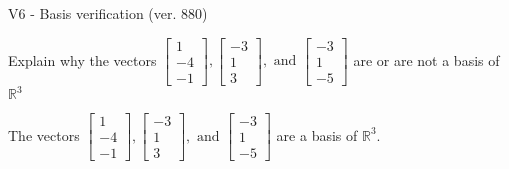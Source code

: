 \begin{exercise}
  \begin{exerciseTitle}V6 - Basis verification (ver. 880)\end{exerciseTitle}
  \begin{exerciseStatement}
    Explain why the vectors \(\left[\begin{array}{r}
1 \\
-4 \\
-1
\end{array}\right] , \left[\begin{array}{r}
-3 \\
1 \\
3
\end{array}\right] , \text{ and } \left[\begin{array}{r}
-3 \\
1 \\
-5
\end{array}\right]\) are or are not a basis of \(\mathbb{R}^3\)	


  \end{exerciseStatement}
  \begin{exerciseAnswer}
   The vectors \(\left[\begin{array}{r}
1 \\
-4 \\
-1
\end{array}\right] , \left[\begin{array}{r}
-3 \\
1 \\
3
\end{array}\right] , \text{ and } \left[\begin{array}{r}
-3 \\
1 \\
-5
\end{array}\right]\) 
  	 are  a basis of \(\mathbb{R}^3\).
  


  \end{exerciseAnswer}
\end{exercise}